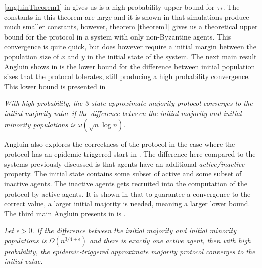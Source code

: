 \ref{angluinTheorem1} in  gives us is a high probability upper bound for $\tau_*$. The constants in this theorem are large and it is shown in \cite{angluinSimplePopulationProtocol2008} that simulations produce much smaller constants, however, theorem \ref{theorem1} gives us a theoretical upper bound for the protocol in a system with only non-Byzantine agents. This convergence is quite quick, but does however require a initial margin between the population size of $x$ and $y$ in the initial state of the system. The next main result Angluin shows in \cite{angluinSimplePopulationProtocol2008} is the lower bound for the difference between initial population sizes that the protocol tolerates, still producing a high probability convergence. This lower bound is presented in 


 \begin{theorem}
    \textit{With high probability, the 3-state approximate majority protocol converges to the initial majority value if the difference between the initial majority and initial minority populations is } $\omega(\sqrt{n} \log n)$.
 \end{theorem} 

 Angluin also explores the correctness of the protocol in the case where the protocol has an epidemic-triggered start in \cite{angluinSimplePopulationProtocol2008}. The difference here compared to the systems previously discussed is that agents have an additional \emph{active/inactive} property. The initial state contains some subset of active and some subset of inactive agents. The inactive agents gets recruited into the computation of the protocol by active agents. It is shown in \cite{angluinSimplePopulationProtocol2008} that to guarantee a convergence to the correct value, a larger initial majority is needed, meaning a larger lower bound. The third main Angluin presents in \cite{angluinSimplePopulationProtocol2008} is .

 \begin{theorem}
    \textit{Let $\epsilon > 0$. If the difference between the initial majority and initial minority populations is $\Omega(n^{3/4+\epsilon})$ and there is exactly one active agent, then with high probability, the epidemic-triggered approximate majority protocol converges to the initial value.}
 \end{theorem} 

